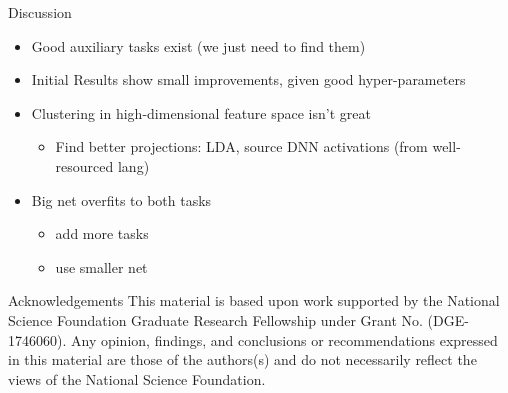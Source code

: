 \documentclass[final]{beamer} %
\begin{document}
\begin{frame}
\begin{columns}
\begin{column}{0.23\textwidth}
{                \begin{block}{\boxnumber Discussion}
          \begin{itemize}
          \item Good auxiliary tasks exist (we just need to find them)
          \item Initial Results show small improvements, given good hyper-parameters
          \item Clustering in high-dimensional feature space isn't great
                  \begin{itemize}
                  \item Find better projections: LDA, source DNN activations (from well-resourced lang)
                  \end{itemize}
                \item Big net overfits to both tasks
                            \begin{itemize}
                            \item add more tasks
                            \item use smaller net
                            \end{itemize}
          \end{itemize}
        \end{block}        

        \vfill
        


        
        
        \begin{block}{\boxnumber Acknowledgements}
          \footnotesize{This material is based upon work supported by the National Science Foundation Graduate Research Fellowship under Grant No. (DGE-1746060). Any opinion, findings, and conclusions or recommendations expressed in this material are those of the authors(s) and do not necessarily reflect the views of the National Science Foundation.}
        \end{block}

        \vfill
        
        }%
    \end{column}
    
  \end{columns}
\end{frame}
\end{document}
